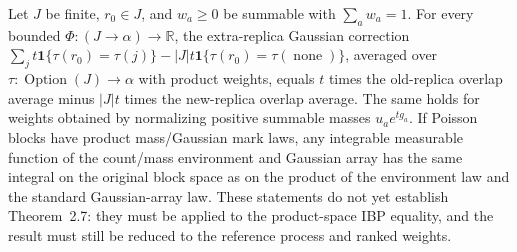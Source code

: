 \begin{lemma}\label{lem:sg:pd-extra-replica-transfer}
  \leanok
  Let $J$ be finite, $r_0\in J$, and $w_a\geq0$ be summable with
  $\sum_a w_a=1$. For every bounded $\Phi:(J\to\alpha)\to\mathbb R$, the extra-replica Gaussian correction
  $\sum_j t\mathbf1\{\tau(r_0)=\tau(j)\}
    -|J|t\mathbf1\{\tau(r_0)=\tau(\operatorname{none})\}$,
  averaged over $\tau:\operatorname{Option}(J)\to\alpha$ with product weights,
  equals $t$ times the old-replica overlap average minus $|J|t$ times
  the new-replica overlap average. The same holds for weights obtained by
  normalizing positive summable masses $u_a e^{tg_a}$. If Poisson blocks have
  product mass/Gaussian mark laws, any integrable measurable function of the
  count/mass environment and Gaussian array has the same integral on the
  original block space as on the product of the environment law and the
  standard Gaussian-array law. These statements do not yet establish
  Theorem~2.7: they must be applied to the product-space IBP equality, and
  the result must still be reduced to the reference process and ranked weights.
\end{lemma}

